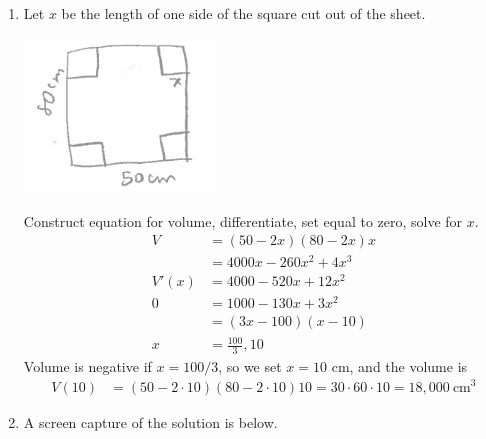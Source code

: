 \begin{enumerate}
\begin{enumerate}
    \begin{center}
    \end{center}
    
    
    
    \end{enumerate}
    
    \item Let $x$ be the length of one side of the square cut out of the sheet. 
        \begin{center}
			\includegraphics[width=0.4\textwidth]{images/ImgWS10Box.png} 
		\end{center}         
    Construct equation for volume, differentiate, set equal to zero, solve for $x$. 
    \begin{align*} 
    	V &= (50-2x)(80-2x) x \\
        &= 4000x-260x^2+4x^3 \\
        V'(x) &= 4000 - 520 x + 12x^2 \\
        0 &= 1000 - 130x + 3x^2 \\
        &= (3x-100) (x-10) \\
        x &= \frac{100}{3}, 10
    \end{align*}
    Volume is negative if $x=100/3$, so we set $x=10$ cm, and the volume is
        \begin{align*} 
    	V (10) &= (50-2\cdot 10)(80-2\cdot 10) 10 = 30 \cdot 60 \cdot 10 = 18,000 \ \text{cm}^3
    \end{align*}
    \item A screen capture of the solution is below.
    

\end{enumerate}
